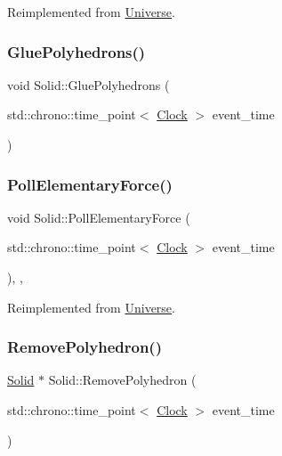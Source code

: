 Reimplemented from \mbox{\hyperlink{classUniverse_a645299738e6b798a037f2a15a2e7cf4d}{Universe}}.

\mbox{\label{classSolid_a94bb5df6d873c14a94355fc95557efd6}} 
\subsubsection{\texorpdfstring{Glue\+Polyhedrons()}{GluePolyhedrons()}}
{\footnotesize\ttfamily void Solid\+::\+Glue\+Polyhedrons (\begin{DoxyParamCaption}\item[{std\+::chrono\+::time\+\_\+point$<$ \mbox{\hyperlink{universe_8h_a0ef8d951d1ca5ab3cfaf7ab4c7a6fd80}{Clock}} $>$}]{event\+\_\+time }\end{DoxyParamCaption})}

\mbox{\label{classSolid_ae2a486e59f11f96a1a39756b3f3da53f}} 
\subsubsection{\texorpdfstring{Poll\+Elementary\+Force()}{PollElementaryForce()}}
{\footnotesize\ttfamily void Solid\+::\+Poll\+Elementary\+Force (\begin{DoxyParamCaption}\item[{std\+::chrono\+::time\+\_\+point$<$ \mbox{\hyperlink{universe_8h_a0ef8d951d1ca5ab3cfaf7ab4c7a6fd80}{Clock}} $>$}]{event\+\_\+time }\end{DoxyParamCaption})\hspace{0.3cm}{\ttfamily [inline]}, {\ttfamily [final]}, {\ttfamily [virtual]}}



Reimplemented from \mbox{\hyperlink{classUniverse_a0c485c504542409cbb5cfd8543c35b11}{Universe}}.

\mbox{\label{classSolid_a1233a3fe43abca7d2a0f83d724fd6640}} 
\subsubsection{\texorpdfstring{Remove\+Polyhedron()}{RemovePolyhedron()}}
{\footnotesize\ttfamily \mbox{\hyperlink{classSolid}{Solid}} $\ast$ Solid\+::\+Remove\+Polyhedron (\begin{DoxyParamCaption}\item[{std\+::chrono\+::time\+\_\+point$<$ \mbox{\hyperlink{universe_8h_a0ef8d951d1ca5ab3cfaf7ab4c7a6fd80}{Clock}} $>$}]{event\+\_\+time }\end{DoxyParamCaption})}


